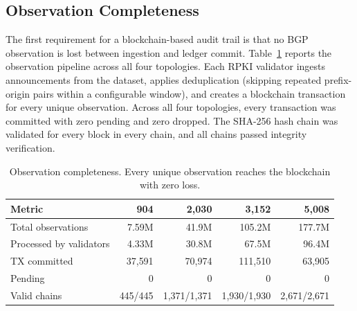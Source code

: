 \documentclass[conference]{IEEEtran}
\begin{document}
\subsection{Observation Completeness}
\label{subsec:observation_completeness}

The first requirement for a blockchain-based audit trail is that no BGP observation is lost between ingestion and ledger commit. Table~\ref{tab:completeness} reports the observation pipeline across all four topologies. Each RPKI validator ingests announcements from the dataset, applies deduplication (skipping repeated prefix-origin pairs within a configurable window), and creates a blockchain transaction for every unique observation. Across all four topologies, every transaction was committed with zero pending and zero dropped. The SHA-256 hash chain was validated for every block in every chain, and all chains passed integrity verification.


\begin{table}[t]
  \caption{Observation completeness. Every unique observation reaches the blockchain with zero loss.}
  \label{tab:completeness}
  \begin{threeparttable}
    \footnotesize
    \setlength{\tabcolsep}{4pt}
    \begin{tabular*}{\columnwidth}{l @{\extracolsep{\fill}} rrrr}
      \toprule
      \textbf{Metric} & \textbf{904} & \textbf{2{,}030} & \textbf{3{,}152} & \textbf{5{,}008} \\
      \midrule
      Total observations     & 7.59M  & 41.9M  & 105.2M & 177.7M \\
      Processed by validators & 4.33M  & 30.8M  & 67.5M  & 96.4M \\
      TX committed           & 37{,}591 & 70{,}974 & 111{,}510 & 63{,}905 \\
      Pending                & 0      & 0      & 0      & 0 \\
      Valid chains           & 445/445 & 1{,}371/1{,}371 & 1{,}930/1{,}930 & 2{,}671/2{,}671 \\
      \bottomrule
    \end{tabular*}
  \end{threeparttable}
\end{table}
\end{document}
